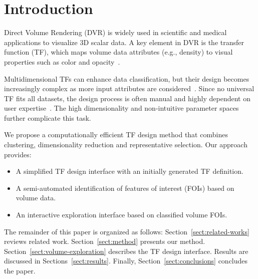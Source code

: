 \section{Introduction}
\label{sect:introduction}

Direct Volume Rendering (DVR) is widely used in scientific and medical applications to visualize 3D scalar data. A key element in DVR is the transfer function (TF), which maps volume data attributes (e.g., density) to visual properties such as color and opacity~\cite{ljung2016}.

Multidimensional TFs can enhance data classification, but their design becomes increasingly complex as more input attributes are considered~\cite{ljung2016, pan2024}. Since no universal TF fits all datasets, the design process is often manual and highly dependent on user expertise~\cite{arens2010}. The high dimensionality and non-intuitive parameter spaces further complicate this task.

We propose a computationally efficient TF design method that combines clustering, dimensionality reduction and representative selection. Our approach provides:

\begin{itemize}
    \item A simplified TF design interface with an initially generated TF definition.
    \item A semi-automated identification of features of interest (FOIs) based on volume data.
    \item An interactive exploration interface based on classified volume FOIs.
\end{itemize}

The remainder of this paper is organized as follows: Section~\ref{sect:related-works} reviews related work. Section~\ref{sect:method} presents our method. Section~\ref{sect:volume-exploration} describes the TF design interface. Results are discussed in Sections~\ref{sect:results}. Finally, Section~\ref{sect:conclusions} concludes the paper.
